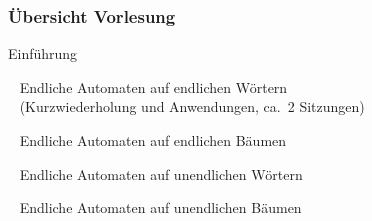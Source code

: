     \newlength{\teileins}
    \begin{frame}
      \frametitle{Übersicht Vorlesung}
      
      Einführung \YES
      
      \par\bigskip
      ~ Endliche Automaten auf endlichen Wörtern \\
      \hspace*{\teileins}~ (Kurzwiederholung und Anwendungen, ca.\ 2 Sitzungen)
    
      \par\bigskip
      ~ Endliche Automaten auf endlichen Bäumen
      
      \par\bigskip
      ~ Endliche Automaten auf unendlichen Wörtern
      
      \par\bigskip
      ~ Endliche Automaten auf unendlichen Bäumen
      
    \end{frame}

